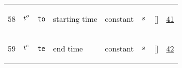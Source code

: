 \begin{longtable}{|p{1cm}|p{3cm}|p{3cm}|p{7cm}|p{3.0cm}|p{3cm}|p{2cm}|p{1cm}|}
                 \\
    58
             & \hypertarget{"v:58"}{ $ {t^{o}}{_{}} $}
             & \verb|to|
             & starting time
             & \begin{lay}constant \end{lay}
             & $ s \, $
             & []
             & \hyperlink{"e:41"}{ 41 }
                 \\
    59
             & \hypertarget{"v:59"}{ $ {t^{e}}{_{}} $}
             & \verb|te|
             & end time
             & \begin{lay}constant \end{lay}
             & $ s \, $
             & []
             & \hyperlink{"e:42"}{ 42 }
                 \\
    \end{longtable}